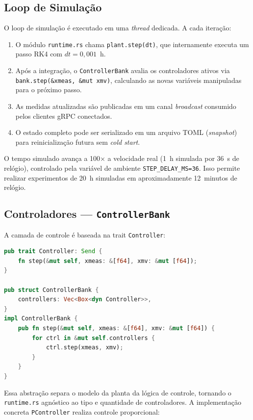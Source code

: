 \subsection{Loop de Simulação}

O loop de simulação é executado em uma \textit{thread} dedicada. A cada iteração:

\begin{enumerate}
  \item O módulo \texttt{runtime.rs} chama \texttt{plant.step(dt)}, que internamente executa um passo RK4 com $dt = 0{,}001$~h.
  \item Após a integração, o \texttt{ControllerBank} avalia os controladores ativos via \texttt{bank.step(\&xmeas, \&mut xmv)}, calculando as novas variáveis manipuladas para o próximo passo.
  \item As medidas atualizadas são publicadas em um canal \textit{broadcast} consumido pelos clientes gRPC conectados.
  \item O estado completo pode ser serializado em um arquivo TOML (\textit{snapshot}) para reinicialização futura sem \textit{cold start}.
\end{enumerate}

O tempo simulado avança a 100× a velocidade real (1~h simulada por 36~s de relógio), controlado pela variável de ambiente \texttt{STEP\_DELAY\_MS=36}. Isso permite realizar experimentos de 20~h simuladas em aproximadamente 12~minutos de relógio.

\subsection{Controladores — \texttt{ControllerBank}}

A camada de controle é baseada na trait \texttt{Controller}:

\begin{lstlisting}[language=Rust, float=htbp, label={lst:controllerbank}, caption={Trait \texttt{Controller} e \texttt{ControllerBank} (\texttt{tep-plant})}]
pub trait Controller: Send {
    fn step(&mut self, xmeas: &[f64], xmv: &mut [f64]);
}

pub struct ControllerBank {
    controllers: Vec<Box<dyn Controller>>,
}
impl ControllerBank {
    pub fn step(&mut self, xmeas: &[f64], xmv: &mut [f64]) {
        for ctrl in &mut self.controllers {
            ctrl.step(xmeas, xmv);
        }
    }
}
\end{lstlisting}

Essa abstração separa o modelo da planta da lógica de controle, tornando o \texttt{runtime.rs} agnóstico ao tipo e quantidade de controladores. A implementação concreta \texttt{PController} realiza controle proporcional:

